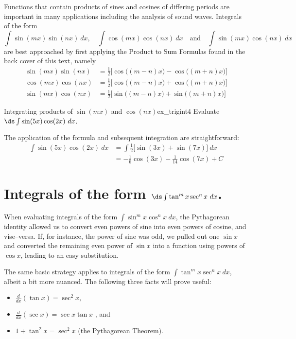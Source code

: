Functions that contain products of sines and cosines of differing periods are important in many applications including the analysis of sound waves. Integrals of the form 
$$\int\sin(mx)\sin(nx)\ dx,\quad \int \cos(mx)\cos(nx)\ dx \quad \text{and}\quad\int \sin(mx)\cos(nx)\ dx$$
are best approached by first applying the Product to Sum Formulas found in the back cover of this text, namely
\begin{align*}
\sin(mx)\sin(nx) &= \frac12\Big[\cos\big((m-n)x\big)-\cos\big((m+n)x\big)\Big] \\
\cos(mx)\cos(nx) &= \frac12\Big[\cos\big((m-n)x\big)+\cos\big((m+n)x\big)\Big] \\
\sin(mx)\cos(nx) &=	\frac12\Big[\sin\big((m-n)x\big)+\sin\big((m+n)x\big)\Big]
\end{align*}

\begin{example}{Integrating products of $\sin(mx)$ and $\cos(nx)$}{ex_trigint4}
Evaluate $\ds\int\sin(5x)\cos(2x)\ dx$.
\end{example}

\begin{solution}
The application of the formula and subsequent integration are straightforward:
\begin{align*}
\int\sin(5x)\cos(2x)\ dx &= \int \frac12\Big[\sin(3x)+\sin(7x)\Big]\ dx \\
												&= -\frac16\cos(3x) - \frac1{14}\cos(7x) + C
\end{align*}
\end{solution}


\section*{Integrals of the form $\ds\int\tan^mx\sec^nx\ dx$.}

When evaluating integrals of the form $\int \sin^mx\cos^nx\ dx$, the Pythagorean identity allowed us to convert even powers of sine into even powers of cosine, and vise--versa. If, for instance, the power of sine was odd, we pulled out one $\sin x$ and converted the remaining even power of $\sin x$ into a function using powers of $\cos x$, leading to an easy substitution.

The same basic strategy applies to integrals of the form $\int \tan^mx\sec^n x\ dx$, albeit a bit more nuanced. The following three facts will prove useful:
\begin{itemize}
\item $\frac{d}{dx}(\tan x) = \sec^2x$, 
\item $\frac{d}{dx}(\sec x) = \sec x\tan x$ , and 
\item	$1+\tan^2x = \sec^2x$ (the Pythagorean Theorem).
\end{itemize}

